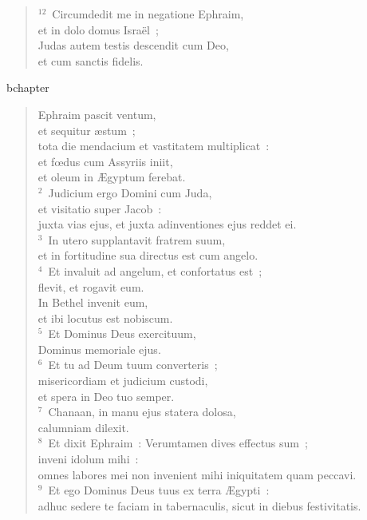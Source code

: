 \begin{verse}${}^{12}$~Circumdedit me in negatione Ephraim,\\ et in dolo domus Isra\"el~;\\ Judas autem testis descendit cum Deo,\\ et cum sanctis fidelis.\end{verse}


bchapter\begin{verse}\vspace{-19pt}Ephraim pascit ventum,\\ et sequitur \ae stum~;\\ tota die mendacium et vastitatem multiplicat~:\\ et fœdus cum Assyriis iniit,\\ et oleum in \AE gyptum ferebat.\\
${}^{2}$~Judicium ergo Domini cum Juda,\\ et visitatio super Jacob~:\\ juxta vias ejus, et juxta adinventiones ejus reddet ei.\\
${}^{3}$~In utero supplantavit fratrem suum,\\ et in fortitudine sua directus est cum angelo.\\
${}^{4}$~Et invaluit ad angelum, et confortatus est~;\\ flevit, et rogavit eum.\\ In Bethel invenit eum,\\ et ibi locutus est nobiscum.\\
${}^{5}$~Et Dominus Deus exercituum,\\ Dominus memoriale ejus.\\
${}^{6}$~Et tu ad Deum tuum converteris~;\\ misericordiam et judicium custodi,\\ et spera in Deo tuo semper.\\
${}^{7}$~Chanaan, in manu ejus statera dolosa,\\ calumniam dilexit.\\
${}^{8}$~Et dixit Ephraim~: Verumtamen dives effectus sum~;\\ inveni idolum mihi~:\\ omnes labores mei non invenient mihi iniquitatem quam peccavi.\\
${}^{9}$~Et ego Dominus Deus tuus ex terra \AE gypti~:\\ adhuc sedere te faciam in tabernaculis, sicut in diebus festivitatis.\\

\end{verse}
